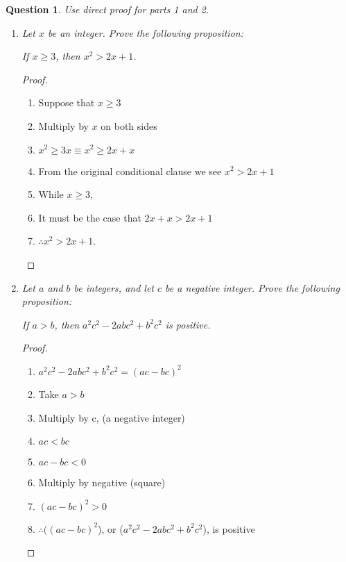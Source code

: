 \documentclass[11pt,oneside]{article}
\newtheorem{question}{Question}
\begin{document}
\bigskip

\begin{question}
    Use direct proof for parts 1 and 2.
\end{question}


\begin{enumerate}
    \item \textit{Let $x$ be an integer. Prove the following proposition:} \\
      \centerline{\textit{If $x \geq 3$, then $x^2 > 2x+1$.}}
      \begin{proof}
          \begin{enumerate}
              \item Suppose that $x \geq 3$
              \item Multiply by $x$ on both sides
              \item $x^2 \geq 3x \equiv x^2 \geq 2x + x$
              \item From the original conditional clause we see $x^2 > 2x + 1$
              \item While $x \geq 3$,
              \item It must be the case that $2x + x > 2x + 1$
              \item $\therefore x^2 > 2x+1$.
          \end{enumerate}
      \end{proof}
    \item \textit{Let $a$ and $b$ be integers, and let $c$ be a negative integer. Prove the following proposition:} \\
      \centerline{\textit{If $a > b$, then $a^2c^2-2abc^2+b^2c^2$ is positive.}}
      \begin{proof}
          \begin{enumerate}
              \item $a^2c^2-2abc^2+b^2c^2 = (ac-bc)^2$
              \item Take $a > b$
              \item Multiply by c, (a negative integer)
              \item $ac < bc$
              \item $ac - bc < 0$
              \item Multiply by negative (square)
              \item $(ac - bc)^2 > 0$
              \item $\therefore ((ac-bc)^2$), or ($a^2c^2-2abc^2+b^2c^2$), is positive
          \end{enumerate}
      \end{proof}

\end{enumerate}
\end{document}
